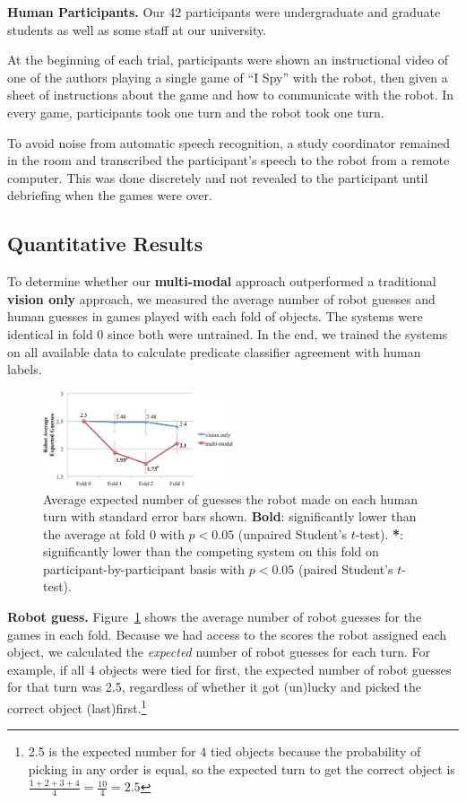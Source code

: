 \documentclass{article}
\newcommand{\ispy}{``I Spy''\xspace}
\begin{document}
\textbf{Human Participants.} Our 42 participants were undergraduate and graduate students as well as some staff at our university.

At the beginning of each trial, participants were shown an instructional video of one of the authors playing a single game of \ispy with the robot, then given a sheet of instructions about the game and how to communicate with the robot. 
In every game, participants took one turn and the robot took one turn.

To avoid noise from automatic speech recognition, a study coordinator remained in the room and transcribed the participant's speech to the robot from a remote computer.
This was done discretely and not revealed to the participant until debriefing when the games were over.


	\subsection{Quantitative Results}
	\label{ssec:results}
To determine whether our \textbf{multi-modal} approach outperformed a traditional \textbf{vision only} approach, we measured the average number of robot guesses and human guesses in games played with each fold of objects.
The systems were identical in fold 0 since both were untrained.
In the end, we trained the systems on all available data to calculate predicate classifier agreement with human labels.

\begin{figure}
\centering
\includegraphics[width=0.5\textwidth]{figures/robot_guesses_error_bars.jpg}
\caption{Average expected number of guesses the robot made on each human turn with standard error bars shown.
\textbf{Bold}: significantly lower than the average at fold 0 with $p<0.05$ (unpaired Student's $t$-test).
\textbf{*}: significantly lower than the competing system on this fold on participant-by-participant basis with $p<0.05$ (paired Student's $t$-test).}
\label{fig:robot_guesses}
\end{figure}

\textbf{Robot guess.} Figure~\ref{fig:robot_guesses} shows the average number of robot guesses for the games in each fold. Because we had access to the scores the robot assigned each object, we calculated the {\it expected} number of robot guesses for each turn.
For example, if all 4 objects were tied for first, the expected number of robot guesses for that turn was 2.5, regardless of whether it got (un)lucky and picked the correct object (last)first.\footnote{2.5 is the expected number for 4 tied objects because the probability of picking in any order is equal, so the expected turn to get the correct object is $\frac{1+2+3+4}{4} = \frac{10}{4} = 2.5$}
\end{document}
